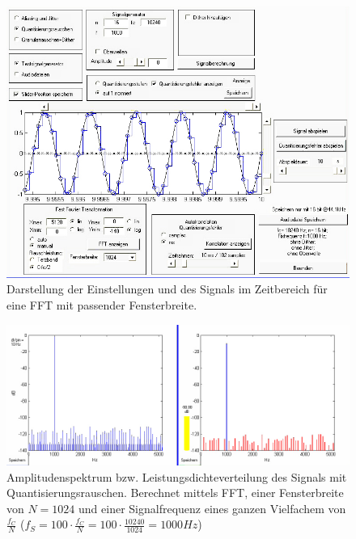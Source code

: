 \begin{figure}[h!]
\centering
\includegraphics[width=\columnwidth]{figures/Aufg1/2_2_fenster_ok_einstell.JPG} 
\caption{Darstellung der Einstellungen und des Signals im Zeitbereich für eine FFT mit passender Fensterbreite.}
\end{figure}

\begin{figure}[h!]
\centering
\includegraphics[width=\columnwidth]{figures/Aufg1/2_2_fenster_ok.JPG} 
\caption{Amplitudenspektrum bzw. Leistungsdichteverteilung des Signals mit Quantisierungsrauschen. Berechnet mittels FFT, einer Fensterbreite von $N = 1024$ und einer Signalfrequenz eines ganzen Vielfachem von $\frac{f_C}{N}$ ($f_S = 100 \cdot \frac{f_C}{N} = 100 \cdot \frac{10240}{1024} = 1000Hz$)}
\label{fig:SNR98}
\end{figure}

